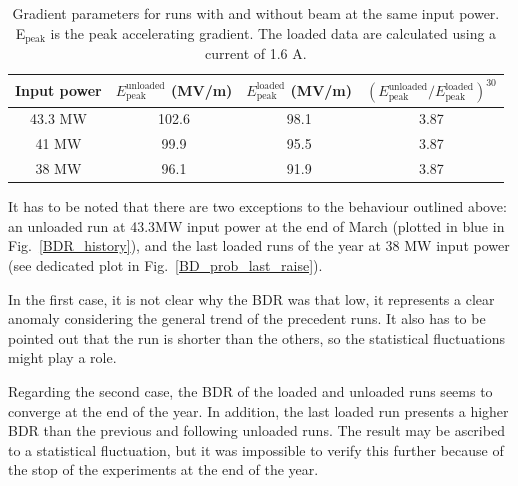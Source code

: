 \begin{table}[h]
  \centering
    \begin{tabular}{ c c c c }
    \toprule
    Input power 		&		$E^\text{unloaded} _\text{peak}$ (MV/m)		& 	$E^\text{loaded} _\text{peak}$ (MV/m)		&	$\left ( E^\text{unloaded} _\text{peak} / E^\text{loaded} _\text{peak} \right )^{30}$	\\
    \midrule
    43.3 MW		&		102.6 								&	98.1									&	3.87		\\
    41 MW			&		99.9 									&	95.5									&	3.87		\\
    38 MW			&		96.1 									&	91.9									&	3.87		\\
    \bottomrule    \end{tabular}
\caption{Gradient parameters for runs with and without beam at the same input power. E$_\text{peak}$ is the peak accelerating gradient. The loaded data are calculated using a current of 1.6 A.}
\label{param_var_p}
\end{table}

It has to be noted that there are two exceptions to the behaviour outlined above: an unloaded run at 43.3MW input power at the end of March (plotted in blue in Fig.~\ref{BDR_history}), and the last loaded runs of the year at 38 MW input power (see dedicated plot in Fig.~\ref{BD_prob_last_raise}). 

In the first case, it is not clear why the BDR was that low, it represents a clear anomaly considering the general trend of the precedent runs. It also has to be pointed out that the run is shorter than the others, so the statistical fluctuations might play a role.

Regarding the second case, the BDR of the loaded and unloaded runs seems to converge at the end of the year. In addition, the last loaded run presents a higher BDR than the previous and following unloaded runs. The result may be ascribed to a statistical fluctuation, but  it was impossible to verify this further because of the stop of the experiments at the end of the year.

